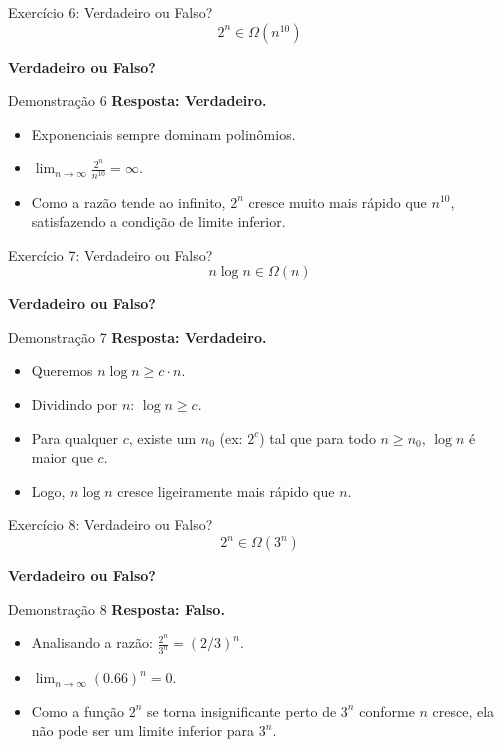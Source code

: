 \documentclass[aspectratio=169]{beamer}
\begin{document}
\begin{frame}{Exercício 6: Verdadeiro ou Falso?}
    \Large
    \[ 2^n \in \Omega(n^{10}) \]
    \begin{center}
        \textbf{Verdadeiro ou Falso?}
    \end{center}
\end{frame}

\begin{frame}{Demonstração 6}
    \textbf{Resposta: Verdadeiro.}
    \begin{itemize}
        \item Exponenciais sempre dominam polinômios.
        \item $\lim_{n \to \infty} \frac{2^n}{n^{10}} = \infty$.
        \item Como a razão tende ao infinito, $2^n$ cresce muito mais rápido que $n^{10}$, satisfazendo a condição de limite inferior.
    \end{itemize}
\end{frame}

\begin{frame}{Exercício 7: Verdadeiro ou Falso?}
    \Large
    \[ n \log n \in \Omega(n) \]
    \begin{center}
        \textbf{Verdadeiro ou Falso?}
    \end{center}
\end{frame}

\begin{frame}{Demonstração 7}
    \textbf{Resposta: Verdadeiro.}
    \begin{itemize}
        \item Queremos $n \log n \ge c \cdot n$.
        \item Dividindo por $n$: $\log n \ge c$.
        \item Para qualquer $c$, existe um $n_0$ (ex: $2^c$) tal que para todo $n \ge n_0$, $\log n$ é maior que $c$.
        \item Logo, $n \log n$ cresce ligeiramente mais rápido que $n$.
    \end{itemize}
\end{frame}

\begin{frame}{Exercício 8: Verdadeiro ou Falso?}
    \Large
    \[ 2^n \in \Omega(3^n) \]
    \begin{center}
        \textbf{Verdadeiro ou Falso?}
    \end{center}
\end{frame}

\begin{frame}{Demonstração 8}
    \textbf{Resposta: Falso.}
    \begin{itemize}
        \item Analisando a razão: $\frac{2^n}{3^n} = (2/3)^n$.
        \item $\lim_{n \to \infty} (0.66)^n = 0$.
        \item Como a função $2^n$ se torna insignificante perto de $3^n$ conforme $n$ cresce, ela não pode ser um limite inferior para $3^n$.
    \end{itemize}
\end{frame}
\end{document}
